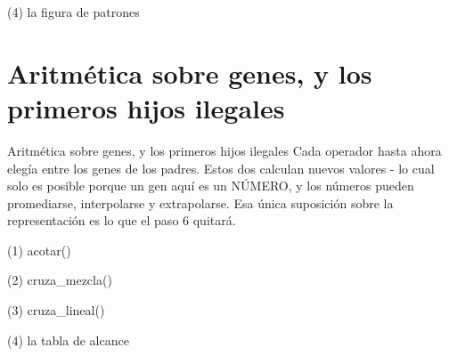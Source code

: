 \begin{frame}[fragile]{(4) la figura de patrones}

\end{frame}


\section{Aritmética sobre genes, y los primeros hijos ilegales}

\begin{frame}{Aritmética sobre genes, y los primeros hijos ilegales}
Cada operador hasta ahora elegía entre los genes de los padres. Estos dos
calculan nuevos valores - lo cual solo es posible porque un gen aquí es un
NÚMERO, y los números pueden promediarse, interpolarse y extrapolarse. Esa
única suposición sobre la representación es lo que el paso 6 quitará.
\end{frame}

\begin{frame}[fragile]{(1) acotar()}

\end{frame}

\begin{frame}[fragile]{(2) cruza\_mezcla()}

\end{frame}

\begin{frame}[fragile]{(3) cruza\_lineal()}

\end{frame}

\begin{frame}[fragile]{(4) la tabla de alcance}

\end{frame}

